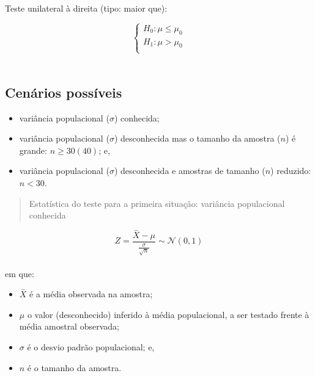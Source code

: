 \documentclass[
]{book}
\providecommand{\tightlist}{%
  \setlength{\itemsep}{0pt}\setlength{\parskip}{0pt}}
\begin{document}
Teste unilateral à direita (tipo: maior que):

\hfill\break
\[
\begin{cases}
    H_{0}: \mu \le \mu_{0}\\
    H_{1}: \mu > \mu_{0}\\
\end{cases}
\]\\

\hypertarget{cenuxe1rios-possuxedveis}{%
\subsection{Cenários possíveis}\label{cenuxe1rios-possuxedveis}}

\hfill\break

\begin{itemize}
\tightlist
\item
  variância populacional (\(\sigma\)) conhecida;\\
\item
  variância populacional (\(\sigma\)) desconhecida mas o tamanho da amostra (\(n\)) é grande: \(n\ge 30(40)\); e,\\
\item
  variância populacional (\(\sigma\)) desconhecida e amostras de tamanho (\(n\)) reduzido: \(n < 30\).
\end{itemize}

\hfill\break

\begin{quote}
Estatística do teste para a primeira situação: variância populacional conhecida
\end{quote}

\[
Z = \frac{\stackrel{-}{X} - \mu}{\frac{\sigma}{\sqrt{n}}} \sim  \mathcal{N}(0,1)
\]\\

em que:

\hfill\break

\begin{itemize}
\tightlist
\item
  \(\stackrel{-}{X}\) é a média observada na amostra;\\
\item
  \(\mu\) o valor (desconhecido) inferido à média populacional, a ser testado frente à média amostral observada;\\
\item
  \(\sigma\) é o desvio padrão populacional; e,\\
\item
  \(n\) é o tamanho da amostra.
\end{itemize}
\end{document}
